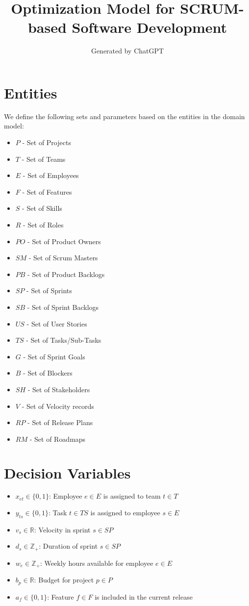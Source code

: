 \documentclass{article}
\title{Optimization Model for SCRUM-based Software Development}
\author{Generated by ChatGPT}
\date{}
\begin{document}
\maketitle

\section{Entities}
We define the following sets and parameters based on the entities in the domain model:
\begin{itemize}
    \item $P$ - Set of Projects
    \item $T$ - Set of Teams
    \item $E$ - Set of Employees
    \item $F$ - Set of Features
    \item $S$ - Set of Skills
    \item $R$ - Set of Roles
    \item $PO$ - Set of Product Owners
    \item $SM$ - Set of Scrum Masters
    \item $PB$ - Set of Product Backlogs
    \item $SP$ - Set of Sprints
    \item $SB$ - Set of Sprint Backlogs
    \item $US$ - Set of User Stories
    \item $TS$ - Set of Tasks/Sub-Tasks
    \item $G$ - Set of Sprint Goals
    \item $B$ - Set of Blockers
    \item $SH$ - Set of Stakeholders
    \item $V$ - Set of Velocity records
    \item $RP$ - Set of Release Plans
    \item $RM$ - Set of Roadmaps
\end{itemize}

\section{Decision Variables}
\begin{itemize}
    \item $x_{et} \in \{0,1\}$: Employee $e \in E$ is assigned to team $t \in T$
    \item $y_{ts} \in \{0,1\}$: Task $t \in TS$ is assigned to employee $s \in E$
    \item $v_s \in \mathbb{R}$: Velocity in sprint $s \in SP$
    \item $d_s \in \mathbb{Z}_{+}$: Duration of sprint $s \in SP$
    \item $w_e \in \mathbb{Z}_{+}$: Weekly hours available for employee $e \in E$
    \item $b_p \in \mathbb{R}$: Budget for project $p \in P$
    \item $a_{f} \in \{0,1\}$: Feature $f \in F$ is included in the current release
\end{itemize}
\end{document}
